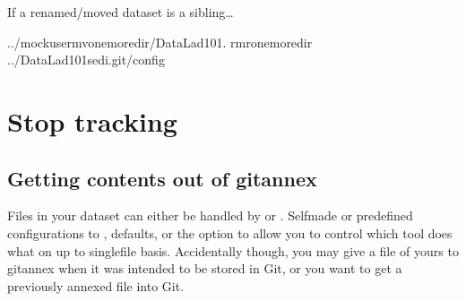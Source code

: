 \begin{findoutmore}[label={fom-adjust-sibling-urls}, before title={\thetcbcounter\ }, check odd page=true]{If a renamed/moved dataset is a sibling…}
\begin{sphinxVerbatim}[commandchars=\\\{\}]
../mock\PYGZus{}usermvonemoredir/DataLad\PYGZhy{}101.
rm\PYGZhy{}ronemoredir
../DataLad\PYGZhy{}101sed\PYGZhy{}i.git/config
\end{sphinxVerbatim}


\end{findoutmore}


\section{Stop tracking}
\label{\detokenize{basics/101-136-filesystem:stop-tracking}}

\subsection{Getting contents out of git\sphinxhyphen{}annex}
\label{\detokenize{basics/101-136-filesystem:getting-contents-out-of-git-annex}}
\sphinxAtStartPar
Files in your dataset can either be handled by {\hyperref[\detokenize{glossary:term-Git}]{}} or {\hyperref[\detokenize{glossary:term-git-annex}]{}}.
Self\sphinxhyphen{}made or predefined configurations to , defaults, or the
 option to  allow you to control which tool
does what on up to single\sphinxhyphen{}file basis. Accidentally though, you may give a file of yours
to git\sphinxhyphen{}annex when it was intended to be stored in Git, or you want to get a previously
annexed file into Git.

